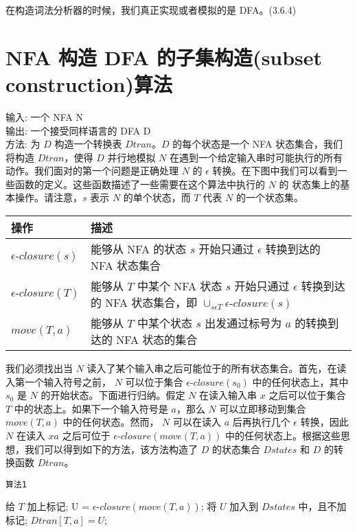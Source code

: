 \documentclass[12pt]{article}
\begin{document}
在构造词法分析器的时候，我们真正实现或者模拟的是 DFA。(3.6.4)


\section*{NFA 构造 DFA 的子集构造(subset construction)算法}

输入: 一个 NFA N  \\
输出: 一个接受同样语言的 DFA D  \\
方法: 为 $D$ 构造一个转换表 $Dtran$。$D$ 的每个状态是一个 NFA 状态集合，我们将构造 $Dtran$，使得 $D$ 并行地模拟 $N$ 在遇到一个给定输入串时可能执行的所有动作。我们面对的第一个问题是正确处理 $N$ 的 $\epsilon$ 转换。在下图中我们可以看到一些函数的定义。这些函数描述了一些需要在这个算法中执行的 $N$ 的 状态集上的基本操作。请注意，$s$ 表示 $N$ 的单个状态，而 $T$ 代表 $N$ 的一个状态集。

\begin{tabular}{lp{10cm}}
\toprule
操作 & 描述 \\
\midrule
$\epsilon \mbox{-} closure(s)$ & 能够从 NFA 的状态 $s$ 开始只通过 $\epsilon$ 转换到达的 NFA 状态集合 \\
$\epsilon \mbox{-} closure(T)$ & 能够从 $T$ 中某个 NFA 状态 $s$ 开始只通过 $\epsilon$ 转换到达的 NFA 状态集合，即 $\cup_{s \epsilon T} \epsilon\mbox{-}closure(s)$ \\
$move(T, a)$ & 能够从 $T$ 中某个状态 $s$ 出发通过标号为 $a$ 的转换到达的 NFA 状态的集合 \\
\bottomrule
\end{tabular}



我们必须找出当 $N$ 读入了某个输入串之后可能位于的所有状态集合。首先，在读入第一个输入符号之前， $N$ 可以位于集合 $\epsilon \mbox{-} closure(s_{0})$ 中的任何状态上，其中 $s_{0}$ 是 $N$ 的开始状态。下面进行归纳。假定 $N$ 在读入输入串 $x$ 之后可以位于集合 $T$ 中的状态上。如果下一个输入符号是 $a$，那么 $N$ 可以立即移动到集合 $move(T, a)$ 中的任何状态。然而， $N$ 可以在读入 $a$ 后再执行几个 $\epsilon$ 转换，因此 $N$ 在读入 $xa$ 之后可位于 $\epsilon \mbox{-} closure(move(T, a))$ 中的任何状态上。根据这些思想，我们可以得到如下的方法，该方法构造了 $D$ 的状态集合 $Dstates$ 和 $D$ 的转换函数 $Dtran$。

\begin{algorithm}[H]
    \renewcommand{\thealgocf}{}
    \caption{\texttt{算法1}}
  {给 $T$ 加上标记;
   {
    U = $\epsilon \mbox{-} closure(move(T, a))$; 
	  {将 $U$ 加入到 $Dstates$ 中，且不加标记;}
	$Dtran[T, a] = U$;
  }
}
\end{algorithm}
\end{document}
